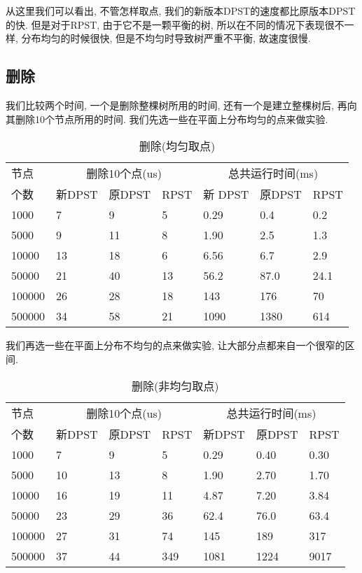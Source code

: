 \documentclass[a4paper]{article}
\begin{document}
从这里我们可以看出, 不管怎样取点, 我们的新版本DPST的速度都比原版本DPST的快. 但是对于RPST, 由于它不是一颗平衡的树, 所以在不同的情况下表现很不一样, 分布均匀的时候很快, 但是不均匀时导致树严重不平衡, 故速度很慢. 

\subsection{删除}
我们比较两个时间, 一个是删除整棵树所用的时间, 还有一个是建立整棵树后, 再向其删除10个节点所用的时间. 我们先选一些在平面上分布均匀的点来做实验. 

\begin{table}[ht]
\centering
\begin{tabular}{|p{1.1cm}|p{0.8cm}|p{0.8cm}|p{0.8cm}|p{0.8cm}|p{0.8cm}|p{0.8cm}|}
\hline 节点 & \multicolumn{3}{|c|}{删除10个点(us)} & \multicolumn{3}{|c|}{总共运行时间(ms)}\\
\cline{2-7}
个数 & 新DPST & 原DPST  & RPST & 新 DPST & 原DPST & RPST\\
\hline 1000 & 7 & 9 & 5 & 0.29 & 0.4 & 0.2\\
\hline 5000 & 9 & 11 & 8 & 1.90 & 2.5 & 1.3\\
\hline 10000 & 13 & 18 & 6 & 6.56 & 6.7 & 2.9\\
\hline 50000 & 21 & 40 & 13 & 56.2 & 87.0 & 24.1\\
\hline 100000 & 26 & 28 & 18 & 143 & 176& 70\\
\hline 500000 & 34 & 58 & 21 & 1090 & 1380 & 614\\
\hline
\end{tabular}
\caption{删除(均匀取点)}
\end{table}

我们再选一些在平面上分布不均匀的点来做实验, 让大部分点都来自一个很窄的区间.

\begin{table}[ht]
\centering
\begin{tabular}{|p{1.1cm}|p{0.8cm}|p{0.8cm}|p{0.8cm}|p{0.8cm}|p{0.8cm}|p{0.8cm}|}
\hline 节点 & \multicolumn{3}{|c|}{删除10个点(us)} & \multicolumn{3}{|c|}{总共运行时间(ms)}\\
\cline{2-7}
个数 & 新DPST & 原DPST  & RPST & 新DPST & 原DPST & RPST\\
\hline 1000 & 7 & 9 & 5 & 0.29 & 0.40 & 0.30\\
\hline 5000 & 10 & 13 & 8 & 1.90 & 2.70 & 1.70\\
\hline 10000 & 16 & 19 & 11 & 4.87 & 7.20 & 3.84\\
\hline 50000 & 23 & 29 & 36 & 62.4 & 76.0 & 63.4\\
\hline 100000 & 27 & 31 & 74 & 145 & 189 & 317\\
\hline 500000 & 37 & 44 & 349 & 1081 & 1224 & 9017\\
\hline
\end{tabular}
\caption{删除(非均匀取点)}
\end{table}
\end{document}
